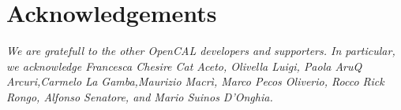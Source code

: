 \chapter*{Acknowledgements}



\newpage
\vspace*{8cm}
\emph{We are gratefull to the other OpenCAL developers and
  supporters. In particular, we acknowledge Francesca Chesire Cat
  Aceto, Olivella Luigi, Paola AruQ Arcuri,Carmelo La Gamba,Maurizio
  Macrì, Marco Pecos Oliverio, Rocco Rick Rongo, Alfonso Senatore, and
  Mario Suinos D'Onghia.}

